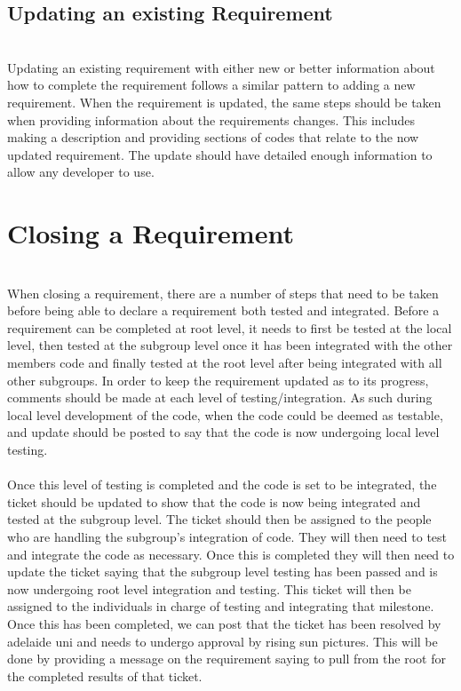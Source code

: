 \documentclass{article}
\begin{document}
\subsection{Updating an existing Requirement}
\\
Updating an existing requirement with either new or better information about how to complete the requirement follows a similar pattern to adding a new requirement. When the requirement is updated, the same steps should be taken when providing information about the requirements changes. This includes making a description and providing sections of codes that relate to the now updated requirement. The update should have detailed enough information to allow any developer to use. \\

\newpage{}
\section{Closing a Requirement}
\\
When closing a requirement, there are a number of steps that need to be taken before being able to declare a requirement both tested and integrated. Before a requirement can be completed at root level, it needs to first be tested at the local level, then tested at the subgroup level once it has been integrated with the other members code and finally tested at the root level after being integrated with all other subgroups. In order to keep the requirement updated as to its progress, comments should be made at each level of testing/integration. As such during local level development of the code, when the code could be deemed as testable, and update should be posted to say that the code is now undergoing local level testing.\\
\\
Once this level of testing is completed and the code is set to be integrated, the ticket should be updated to show that the code is now being integrated and tested at the subgroup level. The ticket should then be assigned to the people who are handling the subgroup's integration of code. They will then need to test and integrate the code as necessary. Once this is completed they will then need to update the ticket saying that the subgroup level testing has been passed and is now undergoing root level integration and testing. This ticket will then be assigned to the individuals in charge of testing and integrating that milestone. Once this has been completed, we can post that the ticket has been resolved by adelaide uni and needs to undergo approval by rising sun pictures. This will be done by providing a message on the requirement saying to pull from the root for the completed results of that ticket.\\
\end{document}
